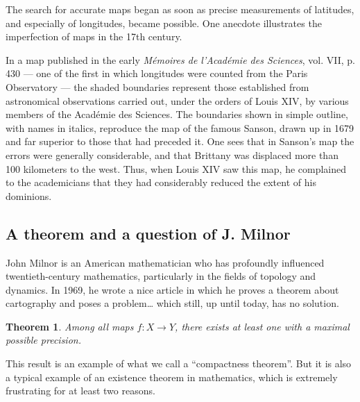 \documentclass{amsart}
\newtheorem*{theorem}{Theorem}
\begin{document}
The search for accurate maps began as soon as precise measurements of
latitudes, and especially of longitudes, became possible. One anecdote
illustrates the imperfection of maps in the 17th century.
\begin{quoting}[vskip=1ex,leftmargin=5mm,rightmargin=5mm]\sf
  In a map published in the early \emph{Mémoires de l'Acad\'emie des
  Sciences}, vol. VII, p. 430 --- one of the first in which longitudes were
  counted from the Paris Observatory --- the shaded boundaries represent
  those established from astronomical observations carried out, under
  the orders of Louis XIV, by various members of the Acad\'emie des
  Sciences. The boundaries shown in simple outline, with names in
  italics, reproduce the map of the famous Sanson, drawn up in 1679
  and far superior to those that had preceded it. One sees that in
  Sanson’s map the errors were generally considerable, and that
  Brittany was displaced more than 100 kilometers to the west. Thus,
  when Louis XIV saw this map, he complained to the academicians that
  they had considerably reduced the extent of his dominions.%
\end{quoting}

\subsection{A theorem and a question of J. Milnor}
John Milnor is an American mathematician who has profoundly influenced
twen\-ti\-eth-century mathematics, particularly in the fields of topology
and dynamics. In 1969, he wrote a nice article%
in which he proves a theorem about cartography and poses a problem\dots
which still, up until today, has no solution.

\begin{theorem}
  Among all maps $f : X \to Y$, there exists at least one with a
  maximal possible precision.
\end{theorem}

This result is an example of what we call a ``compactness theorem''.%
But it is also a typical example of an existence theorem in
mathematics, which is extremely frustrating for at least two reasons.
\end{document}
